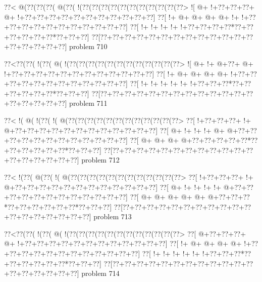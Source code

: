\vbox{\vbox{\goo
\0??<\- @(\0??(\0??(\0??(\- @(\0??(\- !(\0??(\0??(\0??(\0??(\0??(\0??(\0??(\0??(\0??(\0??(\0??>
\- ![\- @+\- !+\0??+\0??+\0??+\- @+\- !+\0??+\0??+\0??+\0??+\0??+\0??+\0??+\0??+\0??+\0??+\0??]
\0??[\- !+\- @+\- @+\- @+\- @+\- !+\- !+\0??+\0??+\0??+\0??+\0??+\0??+\0??+\0??+\0??+\0??+\0??]
\0??[\- !+\- !+\- !+\- !+\- !+\0??+\0??+\0??+\0??*\0??+\0??+\0??+\0??+\0??+\0??*\0??+\0??+\0??]
\0??[\0??+\0??+\0??+\0??+\0??+\0??+\0??+\0??+\0??+\0??+\0??+\0??+\0??+\0??+\0??+\0??+\0??+\0??]
}
\hfil problem 710\hfil\break
}



\vbox{\vbox{\goo
\0??<\0??(\0??(\- !(\0??(\- @(\- !(\0??(\0??(\0??(\0??(\0??(\0??(\0??(\0??(\0??(\0??(\0??(\0??>
\- ![\- @+\- !+\- @+\0??+\- @+\- !+\0??+\0??+\0??+\0??+\0??+\0??+\0??+\0??+\0??+\0??+\0??+\0??]
\0??[\- !+\- @+\- @+\- @+\- @+\- !+\0??+\0??+\0??+\0??+\0??+\0??+\0??+\0??+\0??+\0??+\0??+\0??]
\0??[\- !+\- !+\- !+\- !+\- !+\- !+\0??+\0??+\0??*\0??+\0??+\0??+\0??+\0??+\0??*\0??+\0??+\0??]
\0??[\0??+\0??+\0??+\0??+\0??+\0??+\0??+\0??+\0??+\0??+\0??+\0??+\0??+\0??+\0??+\0??+\0??+\0??]
}
\hfil problem 711\hfil\break
}



\vbox{\vbox{\goo
\0??<\- !(\- @(\- !(\0??(\- !(\- @(\0??(\0??(\0??(\0??(\0??(\0??(\0??(\0??(\0??(\0??(\0??(\0??>
\0??[\- !+\0??+\0??+\0??+\- !+\- @+\0??+\0??+\0??+\0??+\0??+\0??+\0??+\0??+\0??+\0??+\0??+\0??]
\0??[\- @+\- !+\- !+\- !+\- @+\- @+\0??+\0??+\0??+\0??+\0??+\0??+\0??+\0??+\0??+\0??+\0??+\0??]
\0??[\- @+\- @+\- @+\- @+\0??+\0??+\0??+\0??+\0??*\0??+\0??+\0??+\0??+\0??+\0??*\0??+\0??+\0??]
\0??[\0??+\0??+\0??+\0??+\0??+\0??+\0??+\0??+\0??+\0??+\0??+\0??+\0??+\0??+\0??+\0??+\0??+\0??]
}
\hfil problem 712\hfil\break
}



\vbox{\vbox{\goo
\0??<\- !(\0??(\- @(\0??(\- !(\- @(\0??(\0??(\0??(\0??(\0??(\0??(\0??(\0??(\0??(\0??(\0??(\0??>
\0??[\- !+\0??+\0??+\0??+\- !+\- @+\0??+\0??+\0??+\0??+\0??+\0??+\0??+\0??+\0??+\0??+\0??+\0??]
\0??[\- @+\- !+\- !+\- !+\- !+\- @+\0??+\0??+\0??+\0??+\0??+\0??+\0??+\0??+\0??+\0??+\0??+\0??]
\0??[\- @+\- @+\- @+\- @+\- @+\- @+\0??+\0??+\0??*\0??+\0??+\0??+\0??+\0??+\0??*\0??+\0??+\0??]
\0??[\0??+\0??+\0??+\0??+\0??+\0??+\0??+\0??+\0??+\0??+\0??+\0??+\0??+\0??+\0??+\0??+\0??+\0??]
}
\hfil problem 713\hfil\break
}



\vbox{\vbox{\goo
\0??<\0??(\0??(\- !(\0??(\- @(\- !(\0??(\0??(\0??(\0??(\0??(\0??(\0??(\0??(\0??(\0??(\0??(\0??>
\0??[\- @+\0??+\0??+\0??+\- @+\- !+\0??+\0??+\0??+\0??+\0??+\0??+\0??+\0??+\0??+\0??+\0??+\0??]
\0??[\- !+\- @+\- @+\- @+\- @+\- !+\0??+\0??+\0??+\0??+\0??+\0??+\0??+\0??+\0??+\0??+\0??+\0??]
\0??[\- !+\- !+\- !+\- !+\- !+\- !+\0??+\0??+\0??*\0??+\0??+\0??+\0??+\0??+\0??*\0??+\0??+\0??]
\0??[\0??+\0??+\0??+\0??+\0??+\0??+\0??+\0??+\0??+\0??+\0??+\0??+\0??+\0??+\0??+\0??+\0??+\0??]
}
\hfil problem 714\hfil\break
}



